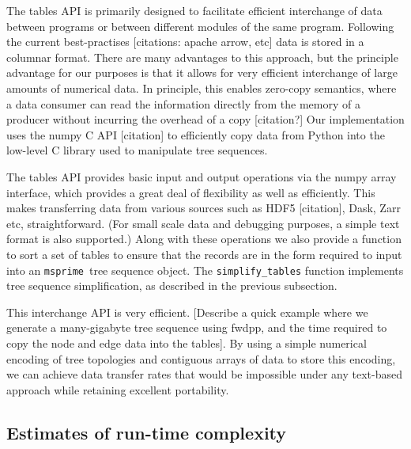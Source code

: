 \documentclass{article}
\newcommand{\msprime}{\texttt{msprime}}
\begin{document}
The tables API is primarily designed to facilitate efficient interchange of
data between programs or between different modules of the same program.
Following the current best-practises [citations: apache arrow, etc] data is stored
in a columnar format. There are many advantages to this approach, but the
principle advantage for our purposes is that it allows for very efficient
interchange of large amounts of numerical data. In principle, this enables
zero-copy semantics, where a data consumer can read the information directly
from the memory of a producer without incurring the overhead of a copy
[citation?] Our implementation uses the numpy C API [citation] to efficiently copy
data from Python into the low-level C library used to manipulate
tree sequences.

The tables API provides basic input and output operations via the numpy
array interface, which provides a great deal of flexibility as well
as efficiently. This makes transferring data from various sources
such as HDF5 [citation], Dask, Zarr etc, straightforward. (For small
scale data and debugging purposes, a simple text format is also supported.)
Along with
these operations we also provide a function to sort a set of tables
to ensure that the records are in the form required to input
into an \msprime\ tree sequence object. The \texttt{simplify\_tables}
function implements tree sequence simplification, as described in the
previous subsection.

This interchange API is very efficient. [Describe a quick example where we generate
a many-gigabyte tree sequence using fwdpp, and the time required
to copy the node and edge data into the tables]. By using a simple numerical
encoding of tree topologies and contiguous arrays of data to store this
encoding, we can achieve data transfer rates that would be impossible under
any text-based approach while retaining excellent portability.

\subsection*{Estimates of run-time complexity}
\end{document}
